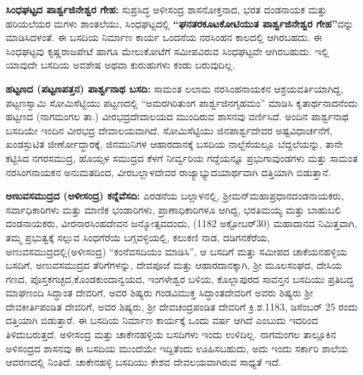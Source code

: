\textbf{ಸಿಂಧಘಟ್ಟದ ಪಾರ್ಶ್ವಜಿನೇಶ್ವರ ಗೇಹ:} ಸುಪ್ರಸಿದ್ಧ ಅಳೀಸಂದ್ರ ಶಾಸನೋಕ್ತನಾದ, ಭರತ ದಂಡನಾಯಕ ಮತ್ತು ಹರಿಯಲೆಯರ ಮಗಳು ಶಾಂತಲೆಯು, ಸಿಂಧಘಟ್ಟದಲ್ಲಿ \textbf{“ಘನತರಕೂಟಕೋಟಿಯುತ ಪಾರ್ಶ್ವಜಿನೇಶ್ವರ ಗೇಹ”}ವನ್ನು ಮಾಡಿಸಿದ\-ಳಂತೆ. ಈ ಬಸದಿಯ ನಿರ್ಮಾಣ ಕಾರ್ಯ ಒಂದನೆಯ ನರಸಿಂಹನ ಕಾಲದಲ್ಲಿ ಆಗಿರಬಹದು. ಈ ಸಿಂಧಘಟ್ಟವು ಕೃಷ್ಣರಾಜಪೇಟೆ ಹಾಗೂ ಮೇಲುಕೋಟೆಗೆ ಸಮೀಪವಿರುವ ಸಿಂಧಘಟ್ಟವೇ ಆಗಿರಬಹುದು. ಇಲ್ಲಿ ಯಾವುದೇ ಬಸದಿಯ ಅವಶೇಷ ಅಥವಾ ಕುರುಹುಗಳು ಕಂಡು ಬರುವುದಿಲ್ಲ.

\textbf{ಹಟ್ಟಣದ (ಪಟ್ಟಣ\general{\enginline{-}}ಪತ್ತನ) ಪಾರ್ಶ್ವನಾಥ ಬಸದಿ:} ಸಾಮಂತ ಲಲಾಮ ನರಸಿಂಹನಾಯಕನ ಆಶ್ರಯವರ್ತಿಯಾಗಿದ್ದ, ಪಟ್ಟಣಸ್ವಾಮಿ ಸೋಮಿಸೆಟ್ಟಿಯು ಪಟ್ಟಣದಲ್ಲಿ “ಅಮರಗಿರಿತುಂಗ ಪಾರ್ಶ್ವಜಿನಗೃಹಮಂ” ಮಾಡಿಸಿ ಕೃತಾರ್ಥನಾದನೆಂದು ಹಟ್ಟಣದ (ನಾಗಮಂಗಲ ತಾ.) ವೀರಭದ್ರದೇವಾಲಯದ ಮುಂದಿರುವ ಶಾಸನವು ವರ್ಣಿಸಿದೆ. ಅಂದಿನ ಪಾರ್ಶ್ವನಾಥ ಬಸದಿಯೇ ಇಂದಿನ ವೀರಭದ್ರ ದೇವಾಲಯವಾಗಿದೆ. ಸೋಮಿಸೆಟ್ಟಿಯು ಜಿನಪಾರ್ಶ್ವದೇವರ ಅಷ್ಟವಿಧಾರ್ಚನೆಗೆ, ಖಂಡಸ್ಫುಟಿತ ಜೀರ್ಣೋದ್ಧಾರಕ್ಕೆ, ಜಿನಮುನಿಗಳ ಆಹಾರದಾನಕ್ಕೆ ಬಸದಿಯ ನಾಲ್ದೆಸೆಯಲ್ಲೂ ಬೆದ್ದಲೆಯನ್ನು, ತಾನೇ ಕಟ್ಟಿಸಿದ ನಗರಸಮುದ್ರ, ಹೊಯ್ಸಳ ಸಮುದ್ರದ ಕೆಳಗೆ ನೀರ್ವ್ವರಿಯ ಗದ್ದೆಯನ್ನೂ ಪ್ರಭುಗಾವುಂಡಗಳು ಮತ್ತು ಸಾಮಂತ ನರಸಿಂಗನಾಯಕನ ಅನುಮತದಿಂದ, ವೀರಬಲ್ಲಾಳದೇವರ ರಾಜ್ಯಾಭ್ಯುದಯಾರ್ಥವಾಗಿ ದತ್ತಿಯಾಗಿ ಬಿಡುತ್ತಾನೆ.

\textbf{ಅಣುವಸಮುದ್ರದ (ಅಳೀಸಂದ್ರ) ಕನ್ನೆವೆಸದಿ:} ಎರಡನೆಯ ಬಲ್ಲಾಳನಲ್ಲಿ, ಶ‍್ರೀಮನ್​ ಮಹಾಪ್ರಧಾನ\break ದಂಡನಾಯಕರು, ಸರ್ವಾಧಿಕಾರಿಗಳು ಮತ್ತು ಮಾಣಿಕ ಭಂಡಾರಿಗಳು, ಪ್ರಾಣಾಧಿಕಾರಿಗಳೂ ಆಗಿದ್ದ, ಭರತಿಮಯ್ಯ ಮತ್ತು ಬಾಹುಬಲಿ ದಂಡನಾಯಕರು, ವೀರನಾರಸಿಂಹದೇವನ ಜನ್ಮೋತ್ಸವದಂದು, (1182 ಅಕ್ಟೋಬರ್​ 30) ಮಹಾದಾನದ ನಿಮಿತ್ತವಾಗಿ, ತಮ್ಮ ಪ್ರಭುತ್ವಕ್ಕೆ ಸಲ್ಲುವ ಸಿಂಧಗೆರೆಯ ಬಗ್ಗವಳ್ಳಿಯಲ್ಲಿ, ಕಲುಕಣಿ ನಾಡ, ದಡಿಗನಕೆರೆಯ, ಅಣುವಸಮುದ್ರ\-ದಲ್ಲಿ(ಅಳೀಸಂದ್ರ) “ಕಂನೆವಸದಿಯಂ ಮಾಡಿಸಿ”, ಆ ಬಸದಿಗೆ ಮತ್ತು ಸಮೀಪದ ಚಾಕೆಯನಹಳ್ಳಿಯ ಬಸದಿಗೆ, ಅಣುವ\-ಸಮುದ್ರದ ತೆರಿಗೆಗಳನ್ನು, ದೇವಪೂಜೆ ಮತ್ತು ಆಹಾರದಾನಕ್ಕಾಗಿ, ಶ‍್ರೀ ಮೂಲಸಂಘದ, ದೇಸಿಯ ಗಣದ, ಪೊಸ್ತಕಗಚ್ಛದ,\break ಕೊಂಡಕುಂದಾನ್ವಯದ, ಇಂಗಳೇಶ್ವರ ಬಳಿಯ, ಕೊಲ್ಲಾಪುರದ ಸಾವನ್ತನ ಬಸದಿಯು ಪ್ರತಿಬದ್ಧ ಮಾಘಣಂದಿ ಸಿದ್ಧಾಂತ ದೇವರಿಗೆ, ಅವರ ಶಿಷ್ಯರು ಗಂಡವಿಮುಕ್ತ ಸಿದ್ಧಾಂತದೇವರಿಗೆ ಅವರು ಶಿಷ್ಯರು ಶ‍್ರೀ ದೇವಕೀರ್ತಿಪಂಡಿತ ದೇವರಿಗೆ, ಅವರ ಶಿಷ್ಯರು, ಶ‍್ರೀ ದೇವಚಂದ್ರಪಂಡಿತ ದೇವರಿಗೆ ಕ್ರಿ.ಶ.1183, ಡಿಸೆಂಬರ್​ 25 ರಂದು ದತ್ತಿಯಾಗಿ ಬಿಡುತ್ತಾರೆ. ಈ ಬಸದಿಯ ನಿರ್ಮಾಣ ಕಾರ್ಯಕ್ಕೆ ಒಂದು ವರ್ಷ ಆಗಿದೆ ಎಂಬುದು ಇದರಿಂದ ತಿಳಿದುಬರುತ್ತದೆ. ಅಳೀಸಂದ್ರ ಮತ್ತು ಚಾಕೇನಹಳ್ಳಿಯ ಬಸದಿಗಳು ಇಂದು ಉಳಿದಿಲ್ಲ. ನಾಗಮಂಗಲ ತಾಲ್ಲೂಕಿನ ಅಳಿಸಂದ್ರದ ಶಾಸನವು ಈ ಬಸದಿಯ ಮುಂದೆಯೇ ಇದ್ದಿತೆಂದು ಊಹಿಸಬಹುದು, ಅದು ಇಂದು ಸರ್ಕಾರಿ ಶಾಲೆಯ ಆವರಣದಲ್ಲಿ ನಿಂತಿದೆ. ಚಾಕೇನಹಳ್ಳಿ ಬಸದಿಯು ಕೇಶವ ದೇವಲಯ\-ವಾಗಿರುವ ಸಾಧ್ಯತೆ ಇದೆ.

